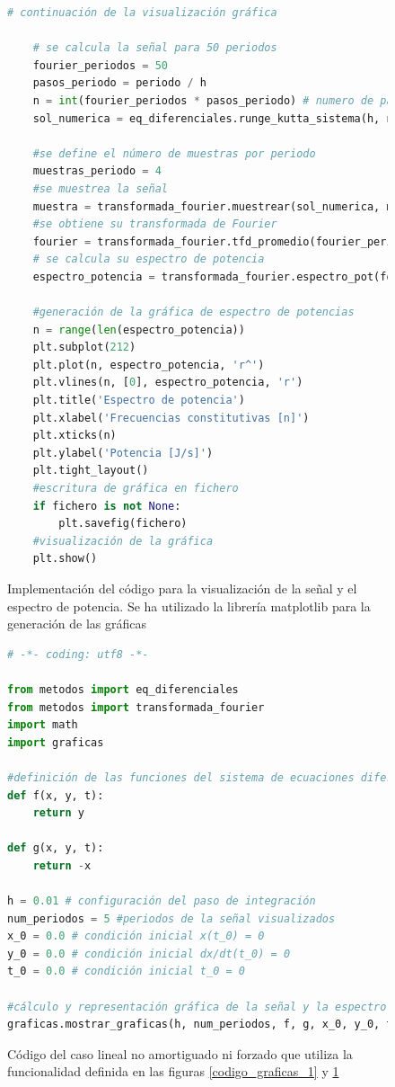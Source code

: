 \documentclass[11pt]{article}
\begin{document}
\begin{figure}
\begin{lstlisting}[language=Python]
	# continuación de la visualización gráfica

	# se calcula la señal para 50 periodos
	fourier_periodos = 50
	pasos_periodo = periodo / h
	n = int(fourier_periodos * pasos_periodo) # numero de pasos de integración para muestrear fourier_periodos
	sol_numerica = eq_diferenciales.runge_kutta_sistema(h, n, f, g, x_0, y_0, t_0)

	#se define el número de muestras por periodo
	muestras_periodo = 4
	#se muestrea la señal
	muestra = transformada_fourier.muestrear(sol_numerica, muestras_periodo, pasos_periodo)
	#se obtiene su transformada de Fourier
	fourier = transformada_fourier.tfd_promedio(fourier_periodos, muestras_periodo, muestra)
	# se calcula su espectro de potencia
	espectro_potencia = transformada_fourier.espectro_pot(fourier)

	#generación de la gráfica de espectro de potencias
	n = range(len(espectro_potencia))
	plt.subplot(212)
	plt.plot(n, espectro_potencia, 'r^')
	plt.vlines(n, [0], espectro_potencia, 'r')
	plt.title('Espectro de potencia')
	plt.xlabel('Frecuencias constitutivas [n]')
	plt.xticks(n)
	plt.ylabel('Potencia [J/s]')
	plt.tight_layout()
	#escritura de gráfica en fichero
	if fichero is not None:
		plt.savefig(fichero)
	#visualización de la gráfica
	plt.show()
\end{lstlisting}
\caption{Implementación del código para la visualización de la señal y el espectro de potencia.
Se ha utilizado la librería matplotlib para la generación de las gráficas}
\label{codigo_graficas_2}
\end{figure}

\begin{figure}
\begin{lstlisting}[language=Python]
# -*- coding: utf8 -*- 

from metodos import eq_diferenciales
from metodos import transformada_fourier
import math
import graficas

#definición de las funciones del sistema de ecuaciones diferenciales
def f(x, y, t):
	return y

def g(x, y, t):
	return -x

h = 0.01 # configuración del paso de integración
num_periodos = 5 #periodos de la señal visualizados
x_0 = 0.0 # condición inicial x(t_0) = 0
y_0 = 0.0 # condición inicial dx/dt(t_0) = 0
t_0 = 0.0 # condición inicial t_0 = 0

#cálculo y representación gráfica de la señal y la espectro de potencias
graficas.mostrar_graficas(h, num_periodos, f, g, x_0, y_0, t_0, 'oscilador lineal no forzado ni amortiguado', 'memoria/caso_lineal.pdf')
\end{lstlisting}
\caption{Código del caso lineal no amortiguado ni forzado que utiliza la funcionalidad definida en las
figuras \ref{codigo_graficas_1} y \ref{codigo_graficas_2}}
\end{figure}
\end{document}
